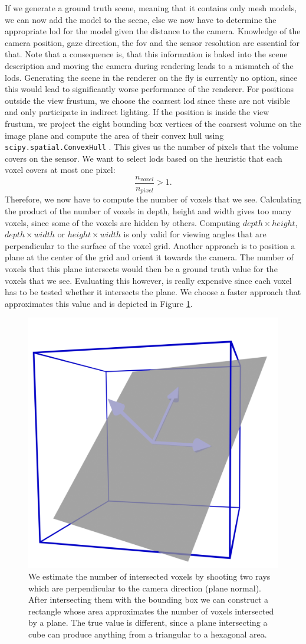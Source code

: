 If we generate a ground truth scene, meaning that it contains only mesh models, we can now add the model to the scene, else we now have to determine the appropriate \ac{lod} for the model given the distance to the camera.
Knowledge of the camera position, gaze direction, the \ac{fov} and the sensor resolution are essential for that.
Note that a consequence is, that this information is baked into the scene description and moving the camera during rendering leads to a mismatch of the \acp{lod}.
Generating the scene in the renderer on the fly is currently no option, since this would lead to significantly worse performance of the renderer.
For positions outside the view frustum, we choose the coarsest \ac{lod} since these are not visible and only participate in indirect lighting.
If the position is inside the view frustum, we project the eight bounding box vertices of the coarsest volume on the image plane and compute the area of their convex hull using \texttt{scipy.spatial.ConvexHull} \cite{scipy}.
This gives us the number of pixels that the volume covers on the sensor.
We want to select \acp{lod} based on the heuristic that each voxel covers at most one pixel:
\begin{equation*}
    \frac{n_{voxel}}{n_{pixel}} > 1.
\end{equation*}
Therefore, we now have to compute the number of voxels that we see.
Calculating the product of the number of voxels in depth, height and width gives too many voxels, since some of the voxels are hidden by others.
Computing $depth \times height$, $depth \times width$ or $height \times width$ is only valid for viewing angles that are perpendicular to the surface of the voxel grid.
Another approach is to position a plane at the center of the grid and orient it towards the camera.
The number of voxels that this plane intersects would then be a ground truth value for the voxels that we see.
Evaluating this however, is really expensive since each voxel has to be tested whether it intersects the plane.
We choose a faster approach that approximates this value and is depicted in Figure \ref{fig:voxel_estimation}.
\begin{figure}[ht]
    \centering
    \includegraphics[width=0.3\linewidth]{img/voxel_estimation.png}
    \caption[Estimation of intersected voxels]{We estimate the number of intersected voxels by shooting two rays which are perpendicular to the camera direction (plane normal). After intersecting them with the bounding box we can construct a rectangle whose area approximates the number of voxels intersected by a plane. The true value is different, since a plane intersecting a cube can produce anything from a triangular to a hexagonal area.}
    \label{fig:voxel_estimation}
\end{figure}
